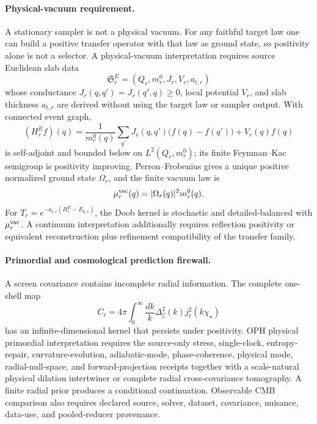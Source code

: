 \paragraph{Physical-vacuum requirement.}
A stationary sampler is not a physical vacuum.  For any faithful target law one can build a
positive transfer operator with that law as ground state, so positivity alone is not a selector.
A physical-vacuum interpretation requires source Euclidean slab data
\[
\mathfrak S_r^E=(Q_r,m_r^0,J_r,V_r,a_{t,r})
\]
whose conductance \(J_r(q,q')=J_r(q',q)\ge0\), local potential \(V_r\), and slab thickness
\(a_{t,r}\) are derived without using the target law or sampler output.  With connected event graph,
\[
(H_r^Ef)(q)
=
\frac{1}{m_r^0(q)}
\sum_{q'}J_r(q,q')\bigl(f(q)-f(q')\bigr)
+
V_r(q)f(q)
\]
is self-adjoint and bounded below on \(L^2(Q_r,m_r^0)\); its finite Feynman--Kac semigroup is
positivity improving.  Perron--Frobenius gives a unique positive normalized ground state
\(\Omega_r\), and the finite vacuum law is
\[
\mu_r^{\rm vac}(q)=|\Omega_r(q)|^2m_r^0(q).
\]
For \(T_r=e^{-a_{t,r}(H_r^E-E_{0,r})}\), the Doob kernel is stochastic and detailed-balanced with
\(\mu_r^{\rm vac}\).  A continuum interpretation additionally requires reflection positivity or
equivalent reconstruction plus refinement compatibility of the transfer family.

\paragraph{Primordial and cosmological prediction firewall.}
A screen covariance contains incomplete radial information. The complete
one-shell map
\[
C_\ell
=
4\pi
\int_0^\infty
\frac{dk}{k}
\Delta_\zeta^2(k)j_\ell^2(k\chi_\star)
\]
has an infinite-dimensional kernel that persists under positivity. OPH
physical primordial interpretation requires the source-only stress, single-clock,
entropy-repair, curvature-evolution, adiabatic-mode, phase-coherence, physical
mode, radial-null-space, and forward-projection receipts together with a
scale-natural physical dilation intertwiner or complete radial cross-covariance
tomography. A finite radial prior produces a conditional continuation.
Observable CMB comparison also requires declared source, solver,
dataset, covariance, nuisance, data-use, and pooled-reducer provenance.
